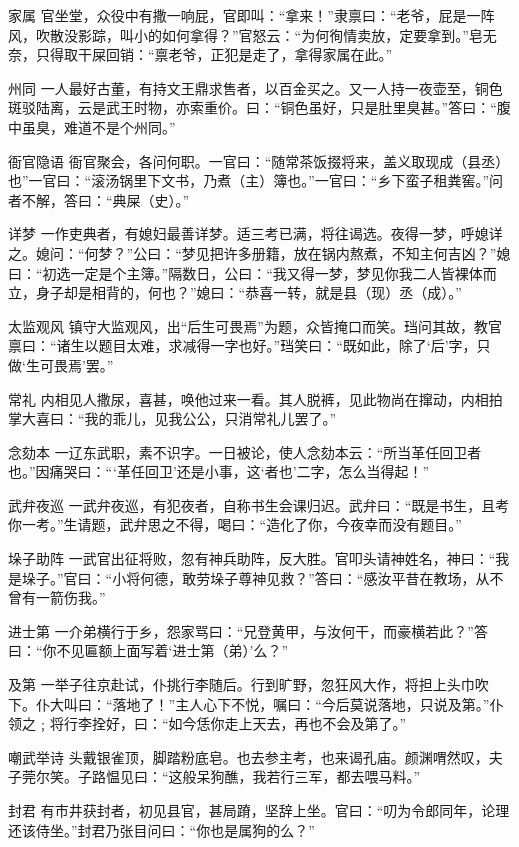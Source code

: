 \documentclass[12pt,UTF8]{ctexbook}
\begin{document}
家属
官坐堂，众役中有撒一响屁，官即叫：“拿来！”隶禀曰：“老爷，屁是一阵风，吹散没影踪，叫小的如何拿得？”官怒云：“为何徇情卖放，定要拿到。”皂无奈，只得取干屎回销：“禀老爷，正犯是走了，拿得家属在此。”

州同
一人最好古董，有持文王鼎求售者，以百金买之。又一人持一夜壶至，铜色斑驳陆离，云是武王时物，亦索重价。曰：“铜色虽好，只是肚里臭甚。”答曰：“腹中虽臭，难道不是个州同。”

衙官隐语
衙官聚会，各问何职。一官曰：“随常茶饭掇将来，盖义取现成（县丞）也”一官曰：“滚汤锅里下文书，乃煮（主）簿也。”一官曰：“乡下蛮子租粪窖。”问者不解，答曰：“典屎（史）。”

详梦
一作吏典者，有媳妇最善详梦。适三考已满，将往谒选。夜得一梦，呼媳详之。媳问：“何梦？”公曰：“梦见把许多册籍，放在锅内熬煮，不知主何吉凶？”媳曰：“初选一定是个主簿。”隔数日，公曰：“我又得一梦，梦见你我二人皆裸体而立，身子却是相背的，何也？”媳曰：“恭喜一转，就是县（现）丞（成）。”

太监观风
镇守大监观风，出“后生可畏焉”为题，众皆掩口而笑。珰问其故，教官禀曰：“诸生以题目太难，求减得一字也好。”珰笑曰：“既如此，除了‘后’字，只做‘生可畏焉’罢。”

常礼
内相见人撒尿，喜甚，唤他过来一看。其人脱裤，见此物尚在撺动，内相拍掌大喜曰：“我的乖儿，见我公公，只消常礼儿罢了。”

念劾本
一辽东武职，素不识字。一日被论，使人念劾本云：“所当革任回卫者也。”因痛哭曰：“‘革任回卫’还是小事，这‘者也’二字，怎么当得起！”

武弁夜巡
一武弁夜巡，有犯夜者，自称书生会课归迟。武弁曰：“既是书生，且考你一考。”生请题，武弁思之不得，喝曰：“造化了你，今夜幸而没有题目。”

垛子助阵
一武官出征将败，忽有神兵助阵，反大胜。官叩头请神姓名，神曰：“我是垛子。”官曰：“小将何德，敢劳垛子尊神见救？”答曰：“感汝平昔在教场，从不曾有一箭伤我。”

进士第
一介弟横行于乡，怨家骂曰：“兄登黄甲，与汝何干，而豪横若此？”答曰：“你不见匾额上面写着‘进士第（弟）’么？”

及第
一举子往京赴试，仆挑行李随后。行到旷野，忽狂风大作，将担上头巾吹下。仆大叫曰：“落地了！”主人心下不悦，嘱曰：“今后莫说落地，只说及第。”仆领之﹔将行李拴好，曰：“如今恁你走上天去，再也不会及第了。”

嘲武举诗
头戴银雀顶，脚踏粉底皂。也去参主考，也来谒孔庙。颜渊喟然叹，夫子莞尔笑。子路愠见曰：“这般呆狗醮，我若行三军，都去喂马料。”

封君
有市井获封者，初见县官，甚局蹐，坚辞上坐。官曰：“叨为令郎同年，论理还该侍坐。”封君乃张目问曰：“你也是属狗的么？”
\end{document}
